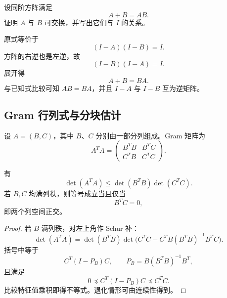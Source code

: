 \begin{exercise}
设同阶方阵满足
\begin{equation}
 A+B=AB.
\end{equation}
证明 $A$ 与 $B$ 可交换，并写出它们与 $I$ 的关系。
\end{exercise}

\begin{solution}
原式等价于
\begin{equation}
 (I-A)(I-B)=I.
\end{equation}
方阵的右逆也是左逆，故
\begin{equation}
 (I-B)(I-A)=I.
\end{equation}
展开得
\begin{equation}
 A+B=BA.
\end{equation}
与已知式比较可知 $AB=BA$，并且 $I-A$ 与 $I-B$ 互为逆矩阵。
\end{solution}

\subsection{Gram 行列式与分块估计}

设 $A=(B,C)$，其中 $B$、$C$ 分别由一部分列组成。Gram 矩阵为
\begin{equation}
 A^TA=\begin{pmatrix}
 B^TB&B^TC\\
 C^TB&C^TC
\end{pmatrix}.
\end{equation}

\begin{theorem}
有
\begin{equation}
 \det(A^TA)
 \leq\det(B^TB)\det(C^TC).
\end{equation}
若 $B,C$ 均满列秩，则等号成立当且仅当
\begin{equation}
 B^TC=0,
\end{equation}
即两个列空间正交。
\end{theorem}

\begin{proof}
若 $B$ 满列秩，对左上角作 Schur 补：
\begin{equation}
 \det(A^TA)
 =\det(B^TB)
 \det\bigl(C^TC-C^TB(B^TB)^{-1}B^TC\bigr).
\end{equation}
括号中等于
\begin{equation}
 C^T(I-P_B)C,
 \qquad
 P_B=B(B^TB)^{-1}B^T,
\end{equation}
且满足
\begin{equation}
 0\preccurlyeq C^T(I-P_B)C\preccurlyeq C^TC.
\end{equation}
比较特征值乘积即得不等式。退化情形可由连续性得到。
\end{proof}

